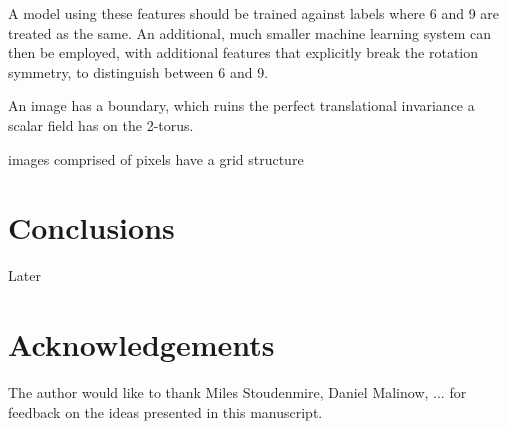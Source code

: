\documentclass[twocolumn, prl]{revtex4-1}
\begin{document}
A model using these features should be trained against labels where 6 and 9 are treated as the same. An additional, much smaller 
machine learning system can then be employed, with additional features that explicitly break the rotation symmetry, to distinguish 
between 6 and 9.


An image has a boundary, which ruins the perfect translational invariance a scalar field has on the 2-torus.


 images comprised of pixels have a grid structure



\section{Conclusions}
\label{Sec:conclusions}

Later

\section{Acknowledgements}

The author would like to thank Miles Stoudenmire, Daniel Malinow, ... 
for feedback on the ideas presented in this manuscript.


\vskip -0.2in

%


%



\vskip 0.2in
\end{document}
